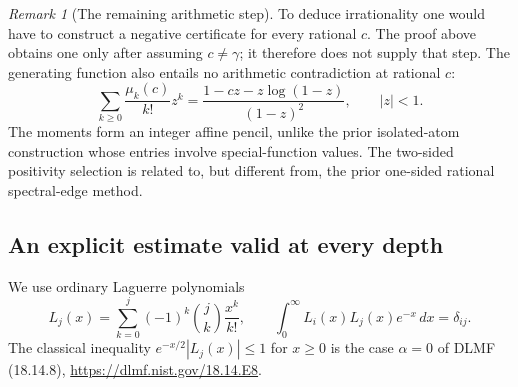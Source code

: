 \documentclass[11pt,a4paper]{article}
\theoremstyle{definition}
\theoremstyle{remark}
\newtheorem{remark}[theorem]{Remark}
\numberwithin{equation}{section}
\begin{document}
\begin{remark}[The remaining arithmetic step]\label{p5:rem:canonical-gap}
To deduce irrationality one would have to construct a negative
certificate for every rational $c$.  The proof above obtains one
only after assuming $c\ne\gamma$; it therefore does not supply that
step.  The generating function also entails no arithmetic
contradiction at rational $c$:
\[
 \sum_{k\geq0}\frac{\mu_k(c)}{k!}z^k
    =\frac{1-cz-z\log(1-z)}{(1-z)^2},\qquad |z|<1.
\]
The moments form an integer affine pencil, unlike the prior
isolated-atom construction whose entries involve special-function
values.  The two-sided positivity selection is related to, but
different from, the prior one-sided rational spectral-edge method.
\end{remark}

\subsection{An explicit estimate valid at every depth}

We use ordinary Laguerre polynomials
\[
 L_j(x)=\sum_{k=0}^j(-1)^k\binom jk\frac{x^k}{k!},
 \qquad
 \int_0^\infty L_i(x)L_j(x)e^{-x}\,dx=\delta_{ij}.
\]
The classical inequality $e^{-x/2}|L_j(x)|\leq1$ for $x\geq0$
is the case $\alpha=0$ of DLMF (18.14.8),
\url{https://dlmf.nist.gov/18.14.E8}.
\end{document}
